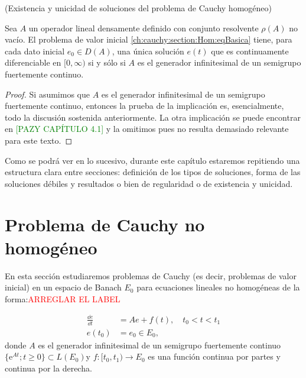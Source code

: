\begin{Teorema}{(Existencia y unicidad de soluciones del problema de Cauchy homogéneo)}
    \label{cauchy:hom:ExistenciaYUnicidadFuerte}

    Sea $A$ un operador lineal densamente definido con conjunto resolvente $\rho(A)$ no vacío. El problema de valor inicial \eqref{ch:cauchy:section:Hom:eqBasica} tiene, para cada dato inicial $e_0 \in D(A)$, una única solución $e(t)$ que es continuamente diferenciable en $[0, \infty)$ si y sólo si $A$ es el generador infinitesimal de un semigrupo fuertemente continuo.
\end{Teorema}

\begin{proof}
    Si asumimos que $A$ es el generador infinitesimal de un semigrupo fuertemente continuo, entonces la prueba de la implicación es, esencialmente, todo la discusión sostenida anteriormente. La otra implicación se puede encontrar en \textcolor{green}{[PAZY CAPÍTULO 4.1]} y la omitimos pues no resulta demasiado relevante para este texto.
\end{proof}

Como se podrá ver en lo sucesivo, durante este capítulo estaremos repitiendo una estructura clara entre secciones: definición de los tipos de soluciones, forma de las soluciones débiles y resultados o bien de regularidad o de existencia y unicidad. 

\section{Problema de Cauchy no homogéneo}
\label{ch:cauchy:section:noHom}

En esta sección estudiaremos problemas de Cauchy (es decir, problemas de valor inicial) en un espacio de Banach $E_0$ para ecuaciones lineales no homogéneas de la forma:\textcolor{red}{ARREGLAR EL LABEL}

\begin{align}
    \label{ch:cauchy:section:noHom:eqBasica}
    \frac{\dd e}{\dd t} &= Ae + f(t), \quad t_0 < t < t_1\\
    e(t_0) &= e_0 \in E_0,
\end{align}
donde $A$ es el generador infinitesimal de un semigrupo fuertemente continuo $\{\mathrm{e}^{At} ; t \geq 0\} \subset L(E_0)$\footnotemark y $f : [t_0, t_1) \rightarrow E_0$ es una función continua por partes y continua por la derecha.

